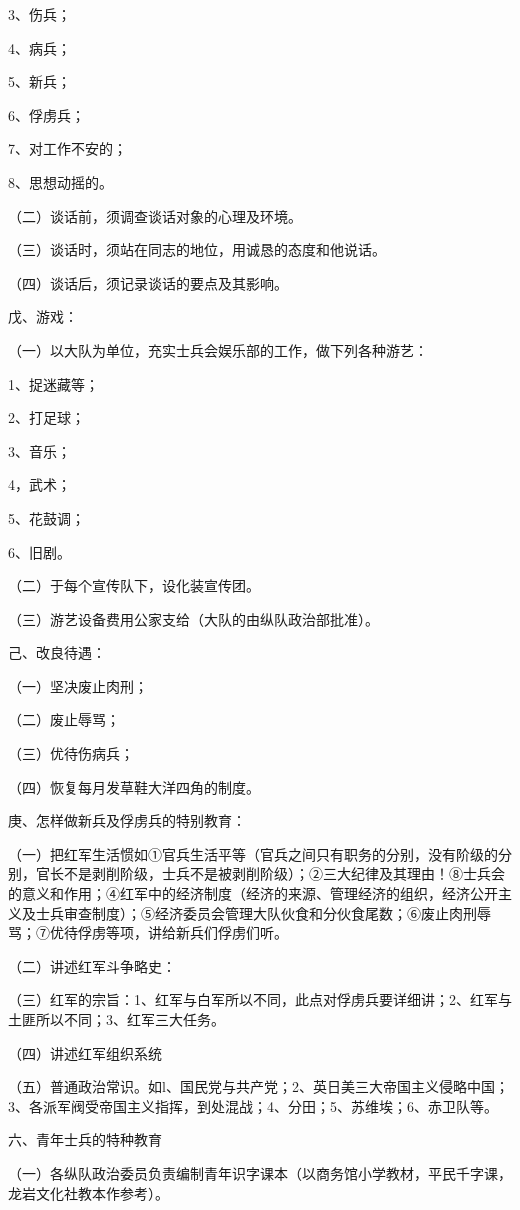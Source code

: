 3、伤兵；

4、病兵；

5、新兵；

6、俘虏兵；

7、对工作不安的；

8、思想动摇的。

（二）谈话前，须调查谈话对象的心理及环境。

（三）谈话时，须站在同志的地位，用诚恳的态度和他说话。

（四）谈话后，须记录谈话的要点及其影响。

戊、游戏：

（一）以大队为单位，充实士兵会娱乐部的工作，做下列各种游艺：

1、捉迷藏等；

2、打足球；

3、音乐；

4，武术；

5、花鼓调；

6、旧剧。

（二）于每个宣传队下，设化装宣传团。

（三）游艺设备费用公家支给（大队的由纵队政治部批准）。

己、改良待遇：

（一）坚决废止肉刑；

（二）废止辱骂；

（三）优待伤病兵；

（四）恢复每月发草鞋大洋四角的制度。

庚、怎样做新兵及俘虏兵的特别教育：

（一）把红军生活惯如①官兵生活平等（官兵之间只有职务的分别，没有阶级的分别，官长不是剥削阶级，士兵不是被剥削阶级）；②三大纪律及其理由！⑧士兵会的意义和作用；④红军中的经济制度（经济的来源、管理经济的组织，经济公开主义及士兵审查制度）；⑤经济委员会管理大队伙食和分伙食尾数；⑥废止肉刑辱骂；⑦优待俘虏等项，讲给新兵们俘虏们听。

（二）讲述红军斗争略史：

（三）红军的宗旨：1、红军与白军所以不同，此点对俘虏兵要详细讲；2、红军与土匪所以不同；3、红军三大任务。

（四）讲述红军组织系统

（五）普通政治常识。如l、国民党与共产党；2、英日美三大帝国主义侵略中国；3、各派军阀受帝国主义指挥，到处混战；4、分田；5、苏维埃；6、赤卫队等。

六、青年士兵的特种教育

（一）各纵队政治委员负责编制青年识字课本（以商务馆小学教材，平民千字课，龙岩文化社教本作参考）。

